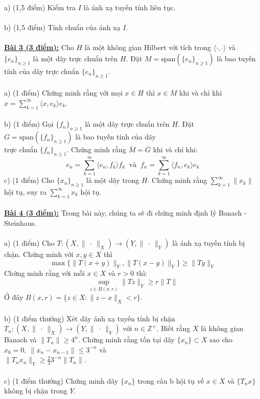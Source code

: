 \documentclass[10pt, a4paper]{article}
\begin{document}
\color{red}a) (1,5 điểm) \color{black}Kiểm tra $I$ là ánh xạ tuyến tính liên tục.\\\\
\color{red}b) (1,5 điểm) \color{black}Tính chuẩn của ánh xạ $I$.\\\\
\color{red}\underline{\textbf{Bài 3 (3 điểm):}} \color{black}Cho $H$ là một không gian Hilbert với tích trong $\langle\cdot,\cdot\rangle$ và $\{e_n\}_{n\ge1}$ là một dãy trực chuẩn trên $H$. Đặt $M=\text{span}(\{e_n\}_{n\ge1})$ là bao tuyến tính của dãy trực chuẩn $\{e_n\}_{n\ge1}$.\\\\
\color{red}a) (1 điểm) \color{black}Chứng minh rằng với mọi $x\in H$ thì $x\in\overline M$ khi và chỉ khi $x=\displaystyle\sum_{k=1}^\infty\langle x,e_k\rangle e_k$.\\\\
\color{red}b) (1 điểm) \color{black}Gọi $\{f_n\}_{n\ge1}$ là một dãy trực chuẩn trên $H$. Đặt $G=\text{span}(\{f_n\}_{n\ge1})$ là bao tuyến tính của dãy\\ trực chuẩn $\{f_n\}_{n\ge1}$. Chứng minh rằng $\overline M=\overline G$ khi và chỉ khi: $$e_n=\displaystyle\sum_{k=1}^\infty\langle e_n,f_k\rangle f_k~\text{ và }~f_n=\displaystyle\sum_{k=1}^\infty\langle f_n,e_k\rangle e_k$$
\color{red}c) (1 điểm) \color{black}Cho $\{x_n\}_{n\ge1}$ là một dãy trong $H$. Chứng minh rằng $\displaystyle\sum_{k=1}^\infty\lVert x_k\rVert$ hội tụ, suy ra $\displaystyle\sum_{k=1}^\infty x_k$ hội tụ.\\\\
\color{red}\underline{\textbf{Bài 4 (3 điểm):}} \color{black}Trong bài này, chúng ta sẽ đi chứng minh định lý Banach - Steinhaus.\\\\
\color{red}a) (1 điểm) \color{black}Cho $T:(X,\lVert~\cdot~\rVert_X)\rightarrow(Y,\lVert~\cdot~\rVert_Y)$ là ánh xạ tuyến tính bị chặn. Chứng minh với $x,y\in X$ thì $$\max\{\lVert T(x+y)\rVert_Y,\lVert T(x-y)\rVert_Y\}\ge\lVert Ty\rVert_Y$$
Chứng minh rằng với mỗi $x\in X$ và $r>0$ thì: $$\displaystyle\sup_{z\in B(x,r)}\lVert Tz\rVert_Y\ge r\lVert T\rVert$$
Ở đây $B(x,r)=\{z\in X:\lVert z-x\rVert_X<r\}$.\\\\
\color{red}b) (1 điểm thưởng) \color{black}Xét dãy ánh xạ tuyến tính bị chặn $T_n:(X,\lVert~\cdot~\rVert_X)\rightarrow(Y,\lVert~\cdot~\rVert_Y)$ với $n\in\mathbb Z^+$. Biết rằng $X$ là không gian Banach và $\lVert T_n\rVert\ge4^n$. Chứng minh rằng tồn tại dãy $\{x_n\}\subset X$ sao cho $x_0=0,~\lVert x_n-x_{n-1}\rVert\le3^{-n}$ và\\ $\lVert T_nx_n\rVert_Y\ge\frac233^{-n}\lVert T_n\rVert$.\\\\
\color{red}c) (1 điểm thưởng) \color{black}Chứng minh dãy $\{x_n\}$ trong câu b hội tụ về $x\in X$ và $\{T_nx\}$ không bị chặn trong $Y$.
\end{document}

